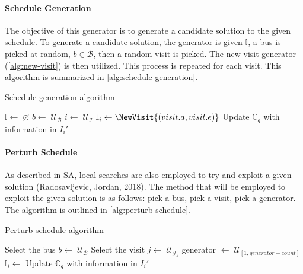 \documentclass[11pt,a4paper,final]{article}
\newcommand{\I}{\mathbb{I}}                 %
\newcommand{\C}{\mathbb{C}}                 %
\newcommand{\U}{\mathcal{U}}                %
\newcommand{\Iset}{\mathcal{I}}             %
\newcommand{\Bset}{\mathcal{B}}             %
\newcommand{\Jset}{\mathcal{J}}             %
\begin{document}
\paragraph{Schedule Generation}
\label{schedule-generation}
The objective of this generator is to generate a candidate solution to the given schedule. To generate a candidate
solution, the generator is given \(\I\), a bus is picked at random, \(b \in \Bset\), then a random visit is picked. The new
visit generator (\ref{alg:new-visit}) is then utilized. This process is repeated for each visit. This algorithm is summarized
in \ref{alg:schedule-generation}.

\begin{algorithm}[H]
\caption{Schedule generation algorithm}
    \LinesNumbered
    \KwIn{$\I$, $\C$}
    \KwOut{$\I_i'$}


    \Begin
    {
        $\I \leftarrow \; \varnothing$\;
        {
            $b \leftarrow\; \U_{\Bset}$\;
            $i\leftarrow\; \U_{\Iset}$\;
            $\I_i \leftarrow \NewVisit{(visit.a, visit.e)}$\;
            Update $\C_q$ with information in $I_i'$\;
        }
            \Return{$\I$}
    }
\label{alg:schedule-generation}
\end{algorithm}

\paragraph{Perturb Schedule}
\label{tweak-schedule}
As described in SA, local searches are also employed to try and exploit a given solution
(Radosavljevic, Jordan, 2018). The method that will be employed to exploit the given solution is as follows: pick
a bus, pick a visit, pick a generator. The algorithm is outlined in \ref{alg:perturb-schedule}.

\begin{algorithm}[H]
\caption{Perturb schedule algorithm}

    \LinesNumbered
    \KwIn{$\I$, $\C$}
    \KwOut{$\I_i'$}


    \Begin
    {
        Select the bus $b \leftarrow\; \U_{\Bset}$\;
        Select the visit $j \leftarrow\; \U_{\Jset_b}$\;
        generator $\leftarrow\; \U_{[1,generator-count]}$\;
        $\I_i \leftarrow$ \GeneratorCallback[generator]{($j, \I, \C$)}\;
        Update $\C_q$ with information in $I_i'$\;
        \Return{$\I_i$}
    }
\label{alg:perturb-schedule}
\end{algorithm}
\end{document}
